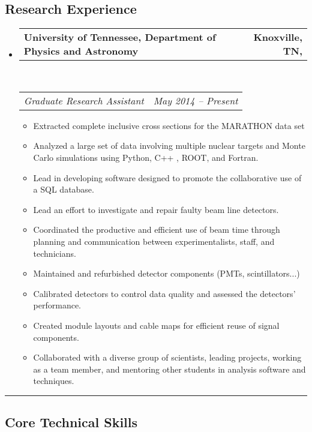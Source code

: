 \documentclass[12pt,letterpaper]{article}
\makeatletter
\newcommand{\headerrow}[2]
{\begin{tabular*}{\linewidth}{l@{\extracolsep{\fill}}r}
	#1 &
	#2 \\
\end{tabular*}}
\makeatother
\begin{document}
\vspace{0.4em}
\subsection*{Research Experience}

\begin{itemize}
	\item
	\headerrow
		{\textbf{University of Tennessee, Department of Physics and Astronomy }}
		{\textbf{  Knoxville, TN,}}
	\\
	\headerrow
		{\emph{Graduate Research Assistant }}
		{\emph{May 2014 -- Present}}
	\begin{itemize}
		\item Extracted complete inclusive cross sections for the MARATHON data set
		\item Analyzed a large set of data involving multiple nuclear targets and Monte Carlo simulations using Python, C++ , ROOT, and Fortran.
		\item Lead in developing software designed to promote the collaborative use of a SQL database. 
		\item Lead an effort to investigate and repair faulty beam line detectors.
		\item Coordinated the productive and efficient use of beam time through planning and communication between experimentalists, staff, and technicians.
		\item Maintained and refurbished detector components (PMTs, scintillators...) 
		\item Calibrated detectors to control data quality and assessed the detectors' performance.
		\item Created module layouts and cable maps for efficient reuse of signal components.
		\item Collaborated with a diverse group of scientists, leading projects, working as a team member, and mentoring other students in analysis software and techniques.
	\end{itemize}
\end{itemize}


\hrule
\vspace{-0.4em}
\subsection*{Core Technical Skills}
\end{document}
